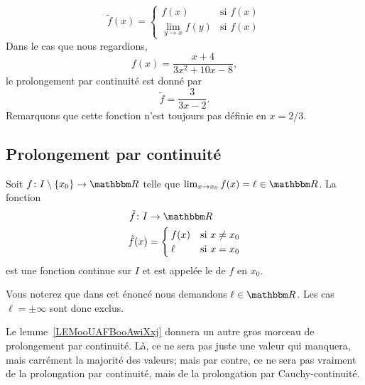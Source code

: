 \begin{equation}
\tilde f(x)=
\begin{cases}
f(x)            &\text{si }f(x)\\
\lim_{y\to x}f(y)   &\text{si }f(x)
\end{cases}
\end{equation}
Dans le cas que nous regardions,
\[
    f(x)=\frac{ x+4 }{ 3x^2+10x-8 },
\]
le prolongement par continuité est donné par
\begin{equation}
\tilde f =\frac{ 3 }{ 3x-2 }.
\end{equation}
Remarquons que cette fonction n'est toujours pas définie en $x=2/3$.

\subsection{Prolongement par continuité}

\begin{propositionDef}
    Soit \( f\colon I\setminus\{ x_0 \}\to \eR\) telle que \( \lim_{x\to x_{0}} f(x)=\ell\in \eR\). La fonction
    \begin{equation}
        \begin{aligned}
            \tilde f\colon I&\to \eR \\
            \tilde f(x)&=\begin{cases}
                f(x)    &   \text{si } x\neq x_0\\
                \ell    &    \text{si } x=x_0
            \end{cases}
        \end{aligned}
    \end{equation}
    est une fonction continue sur \( I\) et est appelée le  de \( f\) en \( x_0\).
\end{propositionDef}
Vous noterez que dans cet énoncé nous demandons \( \ell\in \eR\). Les cas \( \ell=\pm\infty\) sont donc exclus.

\begin{normaltext}
    Le lemme~\ref{LEMooUAFBooAwiXxj} donnera un autre gros morceau de prolongement par continuité. Là, ce ne sera pas juste une valeur qui manquera, mais carrément la majorité des valeurs; mais par contre, ce ne sera pas vraiment de la prolongation par continuité, mais de la prolongation par Cauchy-continuité.
\end{normaltext}

